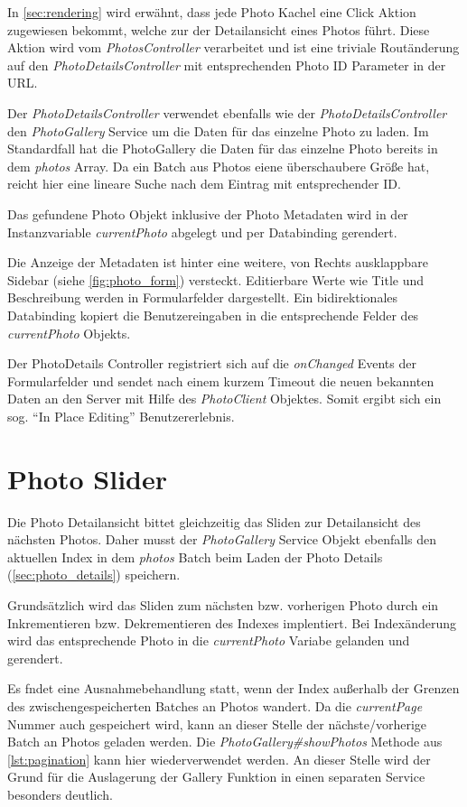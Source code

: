 In \ref{sec:rendering} wird erwähnt, dass jede Photo Kachel eine Click Aktion zugewiesen bekommt, welche zur der Detailansicht eines Photos führt. Diese Aktion wird vom \textit{PhotosController} verarbeitet und ist eine triviale Routänderung auf den \textit{PhotoDetailsController} mit entsprechenden Photo ID Parameter in der URL.

Der \textit{PhotoDetailsController} verwendet ebenfalls wie der \textit{PhotoDetailsController} den \textit{PhotoGallery} Service um die Daten für das einzelne Photo zu laden. Im Standardfall hat die PhotoGallery die Daten für das einzelne Photo bereits in dem \textit{photos} Array. Da ein Batch aus Photos eiene überschaubere Größe hat, reicht hier eine lineare Suche nach dem Eintrag mit entsprechender ID. 

Das gefundene Photo Objekt inklusive der Photo Metadaten wird in der Instanzvariable \textit{currentPhoto} abgelegt und per Databinding gerendert. 

Die Anzeige der Metadaten ist hinter eine weitere, von Rechts ausklappbare Sidebar (siehe \ref{fig:photo_form}) versteckt. Editierbare Werte wie Title und Beschreibung werden in Formularfelder dargestellt. Ein bidirektionales Databinding kopiert die Benutzereingaben in die entsprechende Felder des \textit{currentPhoto} Objekts. 

Der PhotoDetails Controller registriert sich auf die \textit{onChanged } Events der Formularfelder und sendet nach einem kurzem Timeout die neuen bekannten Daten an den Server mit Hilfe des \textit{PhotoClient} Objektes. Somit ergibt sich ein sog.
``In Place Editing'' Benutzererlebnis.

\section{Photo Slider}
\label{sec:photo_slider}

Die Photo Detailansicht bittet gleichzeitig das Sliden zur Detailansicht des nächsten Photos. Daher musst der \textit{PhotoGallery} Service Objekt ebenfalls den aktuellen Index in dem \textit{photos} Batch beim Laden der Photo Details (\ref{sec:photo_details}) speichern.

Grundsätzlich wird das Sliden zum nächsten bzw. vorherigen Photo durch ein Inkrementieren bzw. Dekrementieren des Indexes implentiert. Bei Indexänderung wird das entsprechende Photo in die \textit{currentPhoto} Variabe gelanden und gerendert.

Es fndet eine Ausnahmebehandlung statt, wenn der Index außerhalb der Grenzen des zwischengespeicherten Batches an Photos wandert. Da die \textit{currentPage} Nummer auch gespeichert wird, kann an dieser Stelle der nächste/vorherige Batch an Photos geladen werden. Die \textit{PhotoGallery\#showPhotos} Methode aus \ref{lst:pagination} kann hier wiederverwendet werden. An dieser Stelle wird der Grund für die Auslagerung der Gallery Funktion in einen separaten Service besonders deutlich.

